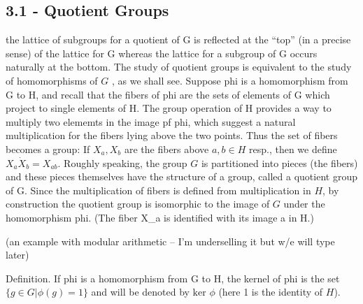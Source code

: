 \documentclass[1    0pt, answers]{exam} \renewcommand{\baselinestretch}{1.05}
\theoremstyle{plain}
\theoremstyle{definition}
\begin{document}
\begin{questions}
\subsection{3.1 - Quotient Groups}

the lattice of subgroups for a quotient of G is reflected at the ``top'' (in a precise sense) of the lattice for G whereas the lattice for a subgroup of G occurs naturally at the bottom.
The study of quotient groups is equivalent to the study of homomorphisms of $G$ , as we shall see.
Suppose phi is a homomorphism from G to H, and recall that the fibers of phi are the sets of elements of G which project to single elements of H.
The group operation of H provides a way to multiply two elememts in the image pf phi, which suggest a natural multiplication for the fibers lying above the two points. Thus the set of fibers becomes a group: If $X_a, X_b$ are the fibers above $a, b \in H$ resp., then we define $X_a \dot X_b = X_{ab}$.
Roughly speaking, the group $G$ is partitioned into pieces (the fibers) and these pieces themselves have the structure of a group, called a quotient group of G.
Since the multiplication of fibers is defined from multiplication in $H$, by construction the quotient group is isomorphic to the image of $G$ under the homomorphism phi. (The fiber X_a is identified with its image a in H.)

(an example with modular arithmetic -- I'm underselling it but w/e will type later)

Definition. If phi is a homomorphism from G to H, the kernel of phi is the set $\{ g \in G | \phi(g) = 1 \}$ and will be denoted by $\text{ker }\phi$ (here 1 is the identity of $H$).


\end{questions}
\end{document}
